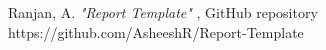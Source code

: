 

\begin{thebibliography}{1}


Ranjan, A. \emph{"Report Template"} , GitHub repository https://github.com/AsheeshR/Report-Template



\end{thebibliography}